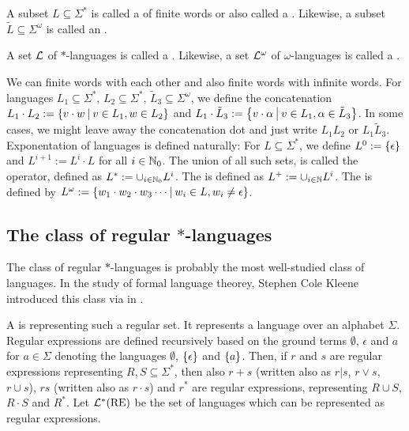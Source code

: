A subset $L \subseteq \Sigma^*$ is called a  of finite words or also called a . Likewise, a subset $\tilde L \subseteq \Sigma^\omega$ is called an .

A set $\mathcal{L}$ of $*$-languages is called a . Likewise, a set $\mathcal{L}^\omega$ of $\omega$-languages is called a .

We can  finite words with each other and also finite words with infinite words. For languages $L_1 \subseteq \Sigma^*$, $L_2 \subseteq \Sigma^*$, $\tilde L_3 \subseteq \Sigma^\omega$, we define the concatenation $L_1 \cdot L_2 := \Set{v \cdot w}{v \in L_1, w \in L_2}$ and $L_1 \cdot \tilde L_3 := \Set{v \cdot \alpha}{v \in L_1, \alpha \in \tilde L_3}$. In some cases, we might leave away the concatenation dot and just write $L_1 L_2$ or $L_1 \tilde L_3$. Exponentation of languages is defined naturally: For $L \subseteq \Sigma^*$, we define $L^0 := \Set{\epsilon}$ and $L^{i+1} := L^i \cdot L$ for all $i \in \mathbb{N}_0$. The union of all such sets, is called the  operator, defined as $L^* := \cup_{i\in\mathbb{N}_0} L^i$. The  is defined as $L^+ := \cup_{i\in\mathbb{N}} L^i$. The  is defined by $L^\omega := \Set{w_1 \cdot w_2 \cdot w_3 \cdots}{w_i \in L, w_i \ne \epsilon}$.

\subsection{The class of regular $*$-languages}
\label{intro:reglang}

The class of regular $*$-languages is probably the most well-studied class of languages. In the study of formal language theorey, Stephen Cole Kleene introduced this class via  in \cite{Kleene56}.

A  is representing such a regular set. It represents a language over an alphabet $\Sigma$. Regular expressions are defined recursively based on the ground terms $\emptyset$, $\epsilon$ and $a$ for $a \in \Sigma$ denoting the languages $\emptyset$, $\Set{\epsilon}$ and $\Set{a}$. Then, if $r$ and $s$ are regular expressions representing $R, S \subseteq \Sigma^*$, then also $r+s$ (written also as $r|s$, $r \vee s$, $r \cup s$), $r s$ (written also as $r \cdot s$) and $r^*$ are regular expressions, representing $R \cup S$, $R \cdot S$ and $R^*$. Let $\mathcal{L}^*(\text{RE})$ be the set of languages which can be represented as regular expressions.

